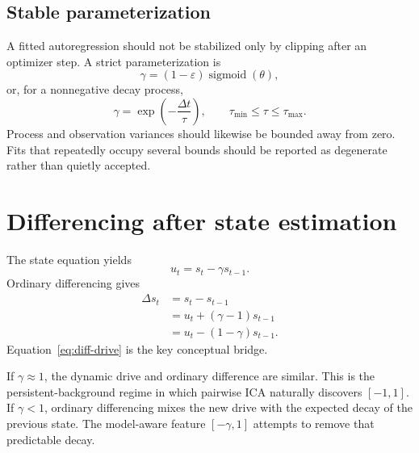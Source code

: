 \documentclass[11pt]{article}
\begin{document}
\subsection{Stable parameterization}

A fitted autoregression should not be stabilized only by clipping after an
optimizer step. A strict parameterization is
\begin{equation}
\gamma
=
(1-\varepsilon)\operatorname{sigmoid}(\theta),
\end{equation}
or, for a nonnegative decay process,
\begin{equation}
\gamma
=
\exp\left(-\frac{\Delta t}{\tau}\right),
\qquad
\tau_{\min}\leq\tau\leq\tau_{\max}.
\end{equation}
Process and observation variances should likewise be bounded away from zero.
Fits that repeatedly occupy several bounds should be reported as degenerate
rather than quietly accepted.

\section{Differencing after state estimation}

The state equation yields
\begin{equation}
u_t=s_t-\gamma s_{t-1}.
\end{equation}
Ordinary differencing gives
\begin{align}
\Delta s_t
&=s_t-s_{t-1}\\
&=u_t+(\gamma-1)s_{t-1}\\
&=u_t-(1-\gamma)s_{t-1}.
\label{eq:diff-drive}
\end{align}
Equation~\eqref{eq:diff-drive} is the key conceptual bridge.

If \(\gamma\approx1\), the dynamic drive and ordinary difference are similar.
This is the persistent-background regime in which pairwise ICA naturally
discovers \([-1,1]\). If \(\gamma<1\), ordinary differencing mixes the new drive
with the expected decay of the previous state. The model-aware feature
\([-\gamma,1]\) attempts to remove that predictable decay.
\end{document}
